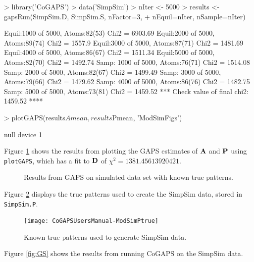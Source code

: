 \documentclass{report}
\begin{document}
\begin{Schunk}
\begin{Sinput}
> library('CoGAPS')
> data('SimpSim')
> nIter <- 5000
> results <- gapsRun(SimpSim.D, SimpSim.S, nFactor=3,
+ 		nEquil=nIter, nSample=nIter)
\end{Sinput}
\begin{Soutput}
Equil:1000 of 5000, Atoms:82(53)  Chi2 = 6903.69
Equil:2000 of 5000, Atoms:89(74)  Chi2 = 1557.9
Equil:3000 of 5000, Atoms:87(71)  Chi2 = 1481.69
Equil:4000 of 5000, Atoms:86(67)  Chi2 = 1511.34
Equil:5000 of 5000, Atoms:82(70)  Chi2 = 1492.74
Samp: 1000 of 5000, Atoms:76(71)  Chi2 = 1514.08
Samp: 2000 of 5000, Atoms:82(67)  Chi2 = 1499.49
Samp: 3000 of 5000, Atoms:79(66)  Chi2 = 1479.62
Samp: 4000 of 5000, Atoms:86(76)  Chi2 = 1482.75
Samp: 5000 of 5000, Atoms:73(81)  Chi2 = 1459.52
 *** Check value of final chi2: 1459.52 **** 
\end{Soutput}
\begin{Sinput}
> plotGAPS(results$Amean, results$Pmean, 'ModSimFigs')
\end{Sinput}
\begin{Soutput}
null device 
          1 
\end{Soutput}
\end{Schunk}
Figure \ref{fig:ModSim} shows the results from plotting the GAPS estimates of ${\bf{A}}$ and ${\bf{P}}$ using \texttt{plotGAPS}, which has a fit to ${\bf{D}}$ of $\chi^{2}=1381.45613920421$.
\begin{figure}[ht]
  \begin{center}
  \end{center}
  \caption{Results from GAPS on simulated data set with known true patterns.}
  \label{fig:ModSim}
\end{figure}
Figure \ref{fig:ModSimPtrue} displays the true patterns used to create the SimpSim data, stored in \texttt{SimpSim.P}.
\begin{figure}[ht]
  \begin{center}
\texttt{[image: CoGAPSUsersManual-ModSimPtrue]}
  \end{center}
  \caption{Known true patterns used to generate SimpSim data.}
  \label{fig:ModSimPtrue}
\end{figure}

Figure \ref{fig:GS} shows the results from running CoGAPS on the SimpSim data.
\end{document}
